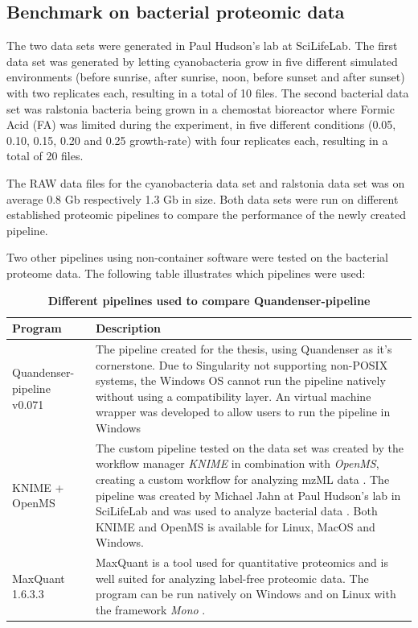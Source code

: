 \subsection{Benchmark on bacterial proteomic data}
The two data sets were generated in Paul Hudson's lab at SciLifeLab. The first data set was generated by letting cyanobacteria grow in five different simulated environments (before sunrise, after sunrise, noon, before sunset and after sunset) with two replicates each, resulting in a total of 10 files. The second bacterial data set was ralstonia bacteria being grown in a chemostat bioreactor where Formic Acid (FA) was limited during the experiment, in five different conditions (0.05, 0.10, 0.15, 0.20 and 0.25 growth-rate) with four replicates each, resulting in a total of 20 files.

The RAW data files for the cyanobacteria data set and ralstonia data set was on average 0.8 Gb respectively 1.3 Gb in size. Both data sets were run on different established proteomic pipelines to compare the performance of the newly created pipeline.

Two other pipelines using non-container software were tested on the bacterial proteome data. The following table illustrates which pipelines were used:

\newcommand{\textone}{\small The pipeline created for the thesis, using Quandenser as it's cornerstone. Due to Singularity not supporting non-POSIX systems, the Windows OS cannot run the pipeline natively without using a compatibility layer. An virtual machine wrapper was developed to allow users to run the pipeline in Windows}
\newcommand{\texttwo}{\small The custom pipeline tested on the data set was created by the workflow manager \textit{KNIME} in combination with \textit{OpenMS}, creating a custom workflow for analyzing mzML data \cite{knime} \cite{openms}. The pipeline was created by Michael Jahn at Paul Hudson's lab in SciLifeLab and was used to analyze bacterial data \cite{m-jahn-pipeline}. Both KNIME and OpenMS is available for Linux, MacOS and Windows.}
\newcommand{\textthree}{\small MaxQuant is a tool used for quantitative proteomics and is well suited for analyzing label-free proteomic data. The program can be run natively on Windows and on Linux with the framework \textit{Mono} \cite{maxquant} \cite{maxquant-installation}.}

\begin{table}[H]
\caption{\textbf{Different pipelines used to compare Quandenser-pipeline}}
\begin{center}
\begin{tabular}{|p{4cm}|p{9cm}|}
\hline
Program & Description \\ \hline \hline
Quandenser-pipeline v0.071 & \textone \\ \hline
KNIME + OpenMS & \texttwo \\ \hline
MaxQuant 1.6.3.3 & \textthree \\ \hline
\end{tabular}
\end{center}
\end{table}

